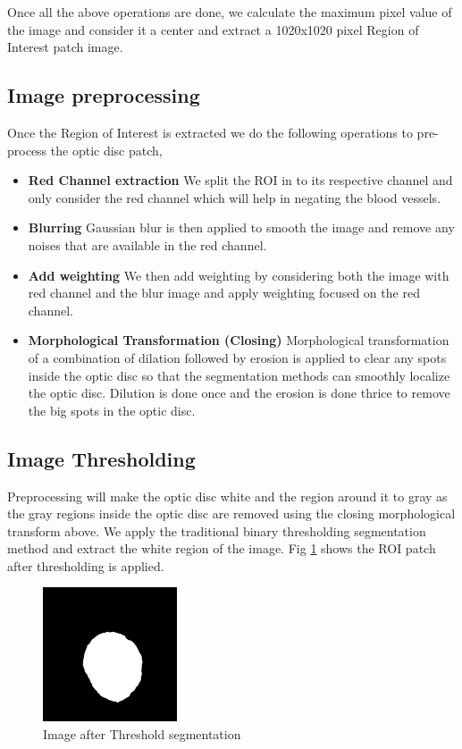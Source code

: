 \documentclass[conference]{IEEEtran}
\begin{document}
Once all the above operations are done, we calculate the maximum pixel value of the image and consider it a center and extract a 1020x1020 pixel Region of Interest patch image.




\subsection{Image preprocessing}
\label{ssec:preprocess}

Once the Region of Interest is extracted we do the following operations to pre-process the optic disc patch,

\begin{itemize}
		\item \textbf{Red Channel extraction} We split the ROI in to its respective channel and only consider the red channel which will help in negating the blood vessels.
		\item \textbf{Blurring} Gaussian blur is then applied to smooth the image and remove any noises that are available in the red channel.
		\item \textbf{Add weighting} We then add weighting by considering both the image with red channel and the blur image and apply weighting focused on the red channel.
		\item \textbf{Morphological Transformation (Closing)} Morphological transformation of a combination of dilation followed by erosion is applied to clear any spots inside the optic disc so that the segmentation methods can smoothly localize the optic disc. Dilution is done once and the erosion is done thrice to remove the big spots in the optic disc.
\end{itemize}  


\subsection{Image Thresholding}
\label{ssec:threshold}

Preprocessing will make the optic disc white and the region around it to gray as the gray regions inside the optic disc are removed using the closing morphological transform above. We apply the traditional binary thresholding segmentation method and extract the white region of the image. Fig \ref{fig:threshold} shows the ROI patch after thresholding is applied.

\begin{figure}[H]
	\centering
	\includegraphics[width=150px]{images/threshold.jpg}
	\caption{Image after Threshold segmentation}
	\label{fig:threshold}
\end{figure}
\end{document}
